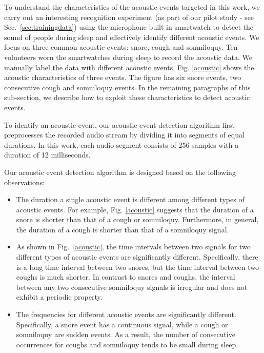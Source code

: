  To understand the characteristics of the acoustic events targeted in this work,  we carry out
an interesting recognition experiment (as part of our pilot study - see Sec.~\ref{sec:trainingdata}) using the microphone built in
smartwatch to detect the sound of people during sleep and effectively identify different acoustic events. We focus on three common acoustic
events: snore, cough and somniloquy. Ten volunteers worn the smartwatches during sleep to record the acoustic data. We manually label the
data with different acoustic events. Fig. \ref{acoustic} shows the acoustic characteristics of three events. The figure has six snore
events, two consecutive cough and somniloquy events. In the remaining paragraphs of this sub-section, we describe how to exploit these
characteristics to detect acoustic events.



 To identify an acoustic event, our acoustic event detection algorithm first preprocesses the recorded audio
stream by dividing it into segments of equal durations. In this work, each
 audio segment consists of 256 samples with a duration of 12 milliseconds.

 Our acoustic event detection algorithm is designed based on the following observations:

 \begin{itemize}
 \item The duration a single acoustic event is different among different types of acoustic events. For example, Fig. \ref{acoustic}
     suggests that the duration of a snore is shorter than that of a cough or somniloquy. Furthermore, in general, the duration of a
     cough is shorter than that of a somniloquy signal.
 \item As shown in Fig.~\ref{acoustic}, the time intervals between two signals for two different types of acoustic events are
     significantly different. Specifically, there is a long time interval between two snores, but the time interval between two coughs is
     much shorter. In contrast to snores and coughs, the interval between any two consecutive somniloquy signals is irregular and does
     not exhibit a periodic property.
\item The frequencies for different acoustic events are significantly different. Specifically, a snore event has a continuous signal,
    while a cough or somniloquy are sudden events. As a result, the number of consecutive occurrences for coughs and somniloquy tends to
    be small during sleep.
\end{itemize}

